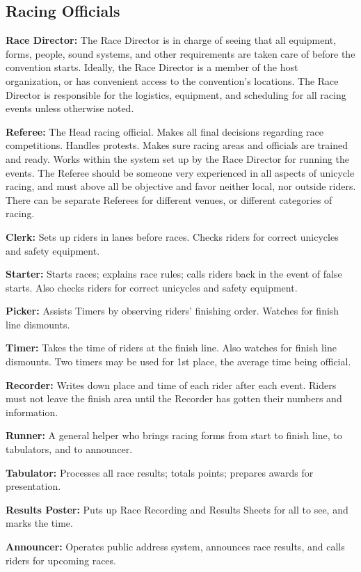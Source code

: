 \subsection{Racing Officials}
\textbf{Race Director:} The Race Director is in charge of seeing that all equipment, forms, people, sound systems, and other requirements are taken care of before the convention starts.
Ideally, the Race Director is a member of the host organization, or has convenient access to the convention's locations.
The Race Director is responsible for the logistics, equipment, and scheduling for all racing events unless otherwise noted.

\textbf{Referee:} The Head racing official.
Makes all final decisions regarding race competitions.
Handles protests.
Makes sure racing areas and officials are trained and ready.
Works within the system set up by the Race Director for running the events.
The Referee should be someone very experienced in all aspects of unicycle racing, and must above all be objective and favor neither local, nor outside riders.
There can be separate Referees for different venues, or different categories of racing.

\textbf{Clerk:} Sets up riders in lanes before races.
Checks riders for correct unicycles and safety equipment.

\textbf{Starter:} Starts races; explains race rules; calls riders back in the event of false starts.
Also checks riders for correct unicycles and safety equipment.

\textbf{Picker:} Assists Timers by observing riders' finishing order.
Watches for finish line dismounts.

\textbf{Timer:} Takes the time of riders at the finish line.
Also watches for finish line dismounts.
Two timers may be used for 1st place, the average time being official.

\textbf{Recorder:} Writes down place and time of each rider after each event.
Riders must not leave the finish area until the Recorder has gotten their numbers and information.

\textbf{Runner:} A general helper who brings racing forms from start to finish line, to tabulators, and to announcer.

\textbf{Tabulator:} Processes all race results; totals points; prepares awards for presentation.

\textbf{Results Poster:} Puts up Race Recording and Results Sheets for all to see, and marks the time.

\textbf{Announcer:} Operates public address system, announces race results, and calls riders for upcoming races.

